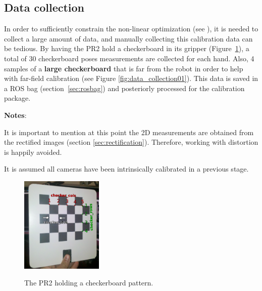 \subsection{Data collection}

In order to sufficiently constrain the non-linear optimization (see \cite{pr2_calibration_paper}), it is needed to collect a large amount of data, and manually collecting this calibration data can be tedious. By having the PR2 hold a checkerboard in its gripper (Figure~\ref{fig:pr2_holdind_cb}), a total of 30 checkerboard poses measurements are collected for each hand. Also, 4 samples of a \textbf{large checkerboard} that is far from the robot in order to help with far-field calibration (see Figure \ref{fig:data_collection01}). This data is saved in a ROS bag (section~\ref{sec:rosbag}) and posteriorly processed for the calibration package.

\noindent
\newpage
\textbf{Notes}:
\begin{itemize*}
  \item It is important to mention at this point the 2D measurements are obtained from the rectified images (section \ref{sec:rectification}). Therefore, working with distortion is happily avoided.
  \item It is assumed all cameras have been intrinsically calibrated in a previous stage.
\end{itemize*}


\begin{figure}[!htbp]
  \centering
  \subfigure
  {
    \includegraphics[width=0.35\textwidth]{images/checkerboard01.png}
  }
  \caption{The PR2 holding a checkerboard pattern.}
 \label{fig:pr2_holdind_cb}
\end{figure}


